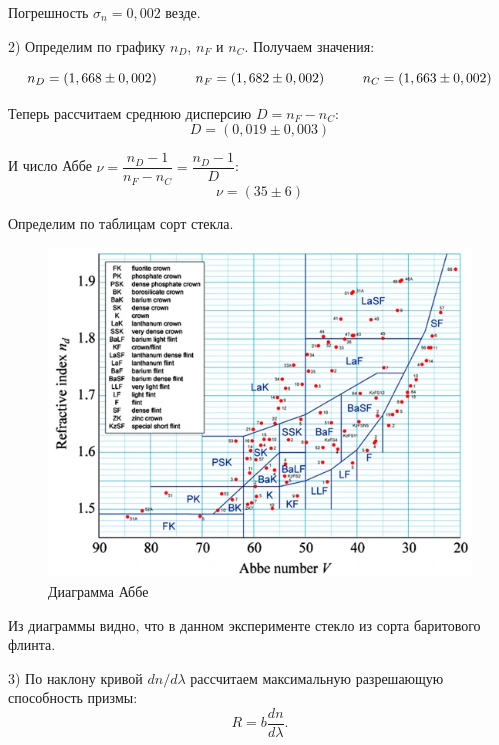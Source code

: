 \documentclass[a4paper,12pt]{article} %
\begin{document}
	Погрешность $\sigma_n = 0,002$ везде.

	2) Определим по графику $n_D$, $n_F$ и $n_C$. Получаем значения:
	
	\begin{equation*}
		n_D = (1,668 \pm 0,002) \hspace{10mm} n_F = (1,682 \pm 0,002) \hspace{10mm} n_C = (1,663 \pm 0,002) 
	\end{equation*}

	Теперь рассчитаем среднюю дисперсию $D = n_F - n_C$:
	\begin{equation*}
		\boxed{D = (0,019 \pm 0,003)}
	\end{equation*}

	И число Аббе $\nu = \dfrac{n_D - 1}{n_F - n_C} = \dfrac{n_D - 1}{D}$:
	\begin{equation*}
		\boxed{\nu = (35 \pm 6)}
	\end{equation*}

	Определим по таблицам сорт стекла.
	\begin{figure}[h!]
		\centering
		\includegraphics[scale=1.2]{Pictures/Стекло}
		\caption{Диаграмма Аббе}
	\end{figure}

	Из диаграммы видно, что в данном эксперименте стекло из сорта баритового флинта.
	
	\newpage
	
	3) По наклону кривой $dn/d\lambda$ рассчитаем максимальную разрешающую способность призмы:
	\begin{equation*}
		R = b\frac{dn}{d\lambda}.
	\end{equation*}	
	
\end{document}
